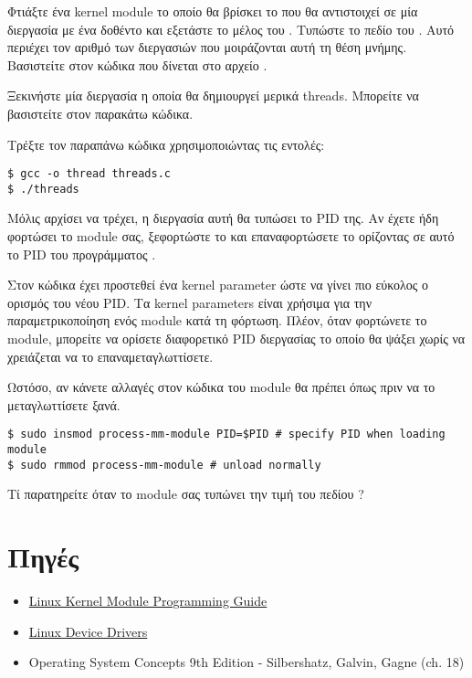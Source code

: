 \documentclass[18pt]{extarticle}
\begin{document}
\begin{question}
    Φτιάξτε ένα kernel module το οποίο θα βρίσκει το 
    που θα αντιστοιχεί σε μία διεργασία με ένα δοθέντο  και εξετάστε το  μέλος του . Τυπώστε το πεδίο του .
    Αυτό περιέχει τον αριθμό των διεργασιών που μοιράζονται αυτή τη θέση μνήμης. 
    Βασιστείτε στον κώδικα που δίνεται στο αρχείο .
    
    Ξεκινήστε μία διεργασία η οποία θα δημιουργεί μερικά threads.
    Μπορείτε να βασιστείτε στον παρακάτω κώδικα.

    \begin{file}[threads.c]
        
    \end{file}

    Τρέξτε τον παραπάνω κώδικα χρησιμοποιώντας τις εντολές:

    \begin{commandline}
\begin{verbatim}
$ gcc -o thread threads.c
$ ./threads
\end{verbatim}
    \end{commandline}
    
    Μόλις αρχίσει να τρέχει, η διεργασία αυτή θα τυπώσει το PID της.
    Αν έχετε ήδη φορτώσει το module σας, ξεφορτώστε το και επαναφορτώσετε το ορίζοντας σε αυτό το PID του προγράμματος .

    Στον κώδικα έχει προστεθεί ένα kernel parameter ώστε να γίνει πιο εύκολος ο ορισμός του νέου PID.
    Τα kernel parameters είναι χρήσιμα για την παραμετρικοποίηση ενός module κατά τη φόρτωση.
    Πλέον, όταν φορτώνετε το module, μπορείτε να ορίσετε διαφορετικό PID διεργασίας το οποίο θα ψάξει χωρίς να χρειάζεται να το επαναμεταγλωττίσετε.

    Ωστόσο, αν κάνετε αλλαγές στον κώδικα του module θα πρέπει όπως πριν να το μεταγλωττίσετε ξανά.

    \begin{commandline}
\begin{verbatim}
$ sudo insmod process-mm-module PID=$PID # specify PID when loading module
$ sudo rmmod process-mm-module # unload normally
\end{verbatim}
    \end{commandline}
    
    Τί παρατηρείτε όταν το module σας τυπώνει την τιμή του πεδίου ?
\end{question}

\section{Πηγές}

\begin{itemize}
    \item \href{https://sysprog21.github.io/lkmpg/}{Linux Kernel Module Programming Guide}
    \item \href{https://lwn.net/Kernel/LDD3/}{Linux Device Drivers}
    \item Operating System Concepts 9th Edition - Silbershatz, Galvin, Gagne (ch. 18)
\end{itemize}
\end{document}
